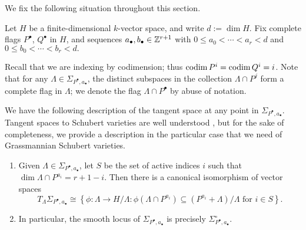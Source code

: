 \documentclass{amsart}
\begin{document}
We fix the following situation throughout this section.

\begin{sit}\label{sit:flags} 
Let $H$ be a finite-dimensional $k$-vector space, and write $d:=\dim H$. Fix complete flags
$P^{\bullet}$, $Q^{\bullet}$ in $H$, and sequences
$a_{\bullet},b_{\bullet}\in {\mathbb Z}^{r+1}$ 
with $0 \le a_0 < \cdots < a_r < d$ and $0 \le b_0 < \cdots < b_r < d.$
\end{sit}

Recall that we are indexing by codimension; thus $\operatorname{codim} P^i=\operatorname{codim} Q^i=i$.   
Note that for any $\Lambda \in {\Sigma}_{P^{\bullet},a_{\bullet}}$, the distinct subspaces in the collection
$\Lambda\cap P^{j}$ form a complete flag in $\Lambda$; 
we denote the flag $\Lambda\cap P^{\bullet}$ by abuse of notation.  

We have the following description of the tangent space at any point in 
${\Sigma}_{P^{\bullet},a_{\bullet}}$. Tangent spaces to Schubert varieties are well 
understood \cite{b-l2}, but for the sake of completeness, we provide a 
description in the particular case that we need of Grassmannian Schubert 
varieties. 

\begin{prop}
\label{prop:tangent-schubert} 
\mbox{}
\begin{enumerate}
\item Given 
$\Lambda \in {\Sigma}_{P^{\bullet},a_{\bullet}}$, let $S$ be the set of active indices $i$ such that $\dim \Lambda\cap P^{a_i} = r+1-i$.  Then 
there is a canonical isomorphism of vector spaces
$$T_{\Lambda}\Sigma_{P^{\bullet},a_{\bullet}}\cong 
\left\{\phi\colon \Lambda\to H/\Lambda: \phi(\Lambda \cap P^{a_i}) 
\subseteq (P^{a_i}+\Lambda)/\Lambda \text{ for } i\in S\right\}.$$

\item In particular, the smooth locus of $\Sigma_{P^{\bullet},a_{\bullet}}$ is precisely
${\Sigma}^\circ_{P^{\bullet},a_{\bullet}}$.
\end{enumerate}
\end{prop}
\end{document}
